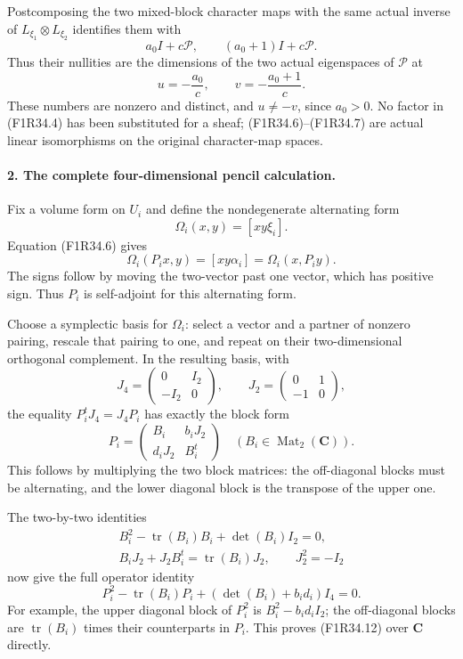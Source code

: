 Postcomposing the two mixed-block
character maps with the same actual
inverse of $L_{\xi_1}\otimes L_{\xi_2}$
identifies them with
\[
                        a_0 I+c\mathcal P,
                   \qquad (a_0+1)I+c\mathcal P.
 \tag{F1R34.7}
\]
Thus their nullities are the dimensions
of the two actual eigenspaces of
$\mathcal P$ at
\[
                  u=-\frac{a_0}{c},\qquad
                  v=-\frac{a_0+1}{c}.
 \tag{F1R34.8}
\]
These numbers are nonzero and
distinct, and $u\ne-v$, since
$a_0>0$. No factor in (F1R34.4)
has been substituted for a sheaf;
(F1R34.6)--(F1R34.7) are actual
linear isomorphisms on the original
character-map spaces.

\paragraph{2. The complete four-dimensional pencil calculation.}
Fix a volume form on $U_i$ and
define the nondegenerate alternating
form
\[
                      \Omega_i(x,y)=[xy\xi_i].
 \tag{F1R34.9}
\]
Equation (F1R34.6) gives
\[
 \Omega_i(P_i x,y)=[xy\alpha_i]
                           =\Omega_i(x,P_i y).
 \tag{F1R34.10}
\]
The signs follow by moving the
two-vector past one vector, which
has positive sign. Thus $P_i$ is
self-adjoint for this alternating
form.

Choose a symplectic basis for
$\Omega_i$: select a vector and
a partner of nonzero pairing,
rescale that pairing to one, and
repeat on their two-dimensional
orthogonal complement. In the
resulting basis, with
\[
 J_4=\begin{pmatrix}0&I_2\\-I_2&0\end{pmatrix},
                  \qquad J_2=\begin{pmatrix}0&1\\-1&0\end{pmatrix},
\]
the equality $P_i^tJ_4=J_4P_i$
has exactly the block form
\[
                 P_i=\begin{pmatrix}B_i&b_iJ_2\\d_iJ_2&B_i^t\end{pmatrix}
                       \quad(B_i\in\operatorname{Mat}_2(\mathbf C)).
 \tag{F1R34.11}
\]
This follows by multiplying the two
block matrices: the off-diagonal
blocks must be alternating, and
the lower diagonal block is the
transpose of the upper one.

The two-by-two identities
\[
 \begin{gathered}
 B_i^2-\operatorname{tr}(B_i)B_i+\det(B_i)I_2=0,\\
 B_iJ_2+J_2B_i^t=\operatorname{tr}(B_i)J_2,
 \qquad J_2^2=-I_2
 \end{gathered}
\]
now give the full operator identity
\[
          P_i^2-\operatorname{tr}(B_i)P_i
                  +(\det(B_i)+b_i d_i)I_4=0.
 \tag{F1R34.12}
\]
For example, the upper diagonal
block of $P_i^2$ is $B_i^2-b_i d_iI_2$;
the off-diagonal blocks are
$\operatorname{tr}(B_i)$ times
their counterparts in $P_i$.
This proves (F1R34.12) over
$\mathbf C$ directly.

